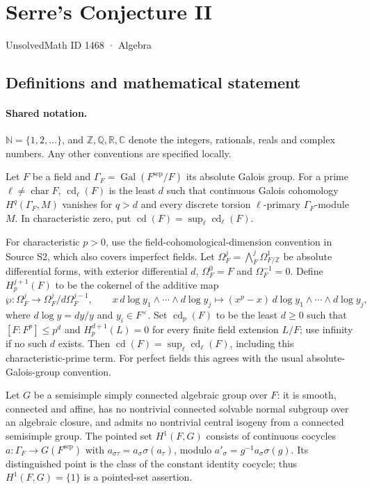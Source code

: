 \documentclass[11pt]{article}
\begin{document}
\setcounter{section}{1467}
\section{Serre's Conjecture II}\label{1468}
{\small\sffamily UnsolvedMath ID 1468 · Algebra}
\subsection{Definitions and mathematical statement}

\paragraph{Shared notation.}$\mathbb N=\{1,2,\ldots\}$, and $\mathbb Z,\mathbb Q,\mathbb R,\mathbb C$ denote the integers, rationals, reals and complex numbers. Any other conventions are specified locally.


Let $F$ be a field and $\Gamma_F=\operatorname{Gal}(F^{\mathrm{sep}}/F)$ its absolute Galois group. For a prime $\ell\ne\operatorname{char}F$, $\operatorname{cd}_\ell(F)$ is the least $d$ such that continuous Galois cohomology $H^q(\Gamma_F,M)$ vanishes for $q>d$ and every discrete torsion $\ell$-primary $\Gamma_F$-module $M$. In characteristic zero, put $\operatorname{cd}(F)=\sup_\ell\operatorname{cd}_\ell(F)$.

For characteristic $p>0$, use the field-cohomological-dimension convention in Source S2, which also covers imperfect fields. Let $\Omega_F^j=\bigwedge_F^j\Omega^1_{F/\mathbb Z}$ be absolute differential forms, with exterior differential $d$, $\Omega_F^0=F$ and $\Omega_F^{-1}=0$. Define $H_p^{j+1}(F)$ to be the cokernel of the additive map
\[
 \wp:\Omega_F^j\longrightarrow\Omega_F^j/d\Omega_F^{j-1},\qquad
 x\,d\log y_1\wedge\cdots\wedge d\log y_j
 \longmapsto (x^p-x)\,d\log y_1\wedge\cdots\wedge d\log y_j,
\]
where $d\log y=dy/y$ and $y_i\in F^\times$. Set $\operatorname{cd}_p(F)$ to be the least $d\ge0$ such that $[F:F^p]\le p^d$ and $H_p^{d+1}(L)=0$ for every finite field extension $L/F$; use infinity if no such $d$ exists. Then $\operatorname{cd}(F)=\sup_\ell\operatorname{cd}_\ell(F)$, including this characteristic-prime term. For perfect fields this agrees with the usual absolute-Galois-group convention.

Let $G$ be a semisimple simply connected algebraic group over $F$: it is smooth, connected and affine, has no nontrivial connected solvable normal subgroup over an algebraic closure, and admits no nontrivial central isogeny from a connected semisimple group. The pointed set $H^1(F,G)$ consists of continuous cocycles $a:\Gamma_F\to G(F^{\mathrm{sep}})$ with $a_{\sigma\tau}=a_\sigma\sigma(a_\tau)$, modulo $a'_\sigma=g^{-1}a_\sigma\sigma(g)$. Its distinguished point is the class of the constant identity cocycle; thus $H^1(F,G)=\{1\}$ is a pointed-set assertion.
\end{document}
